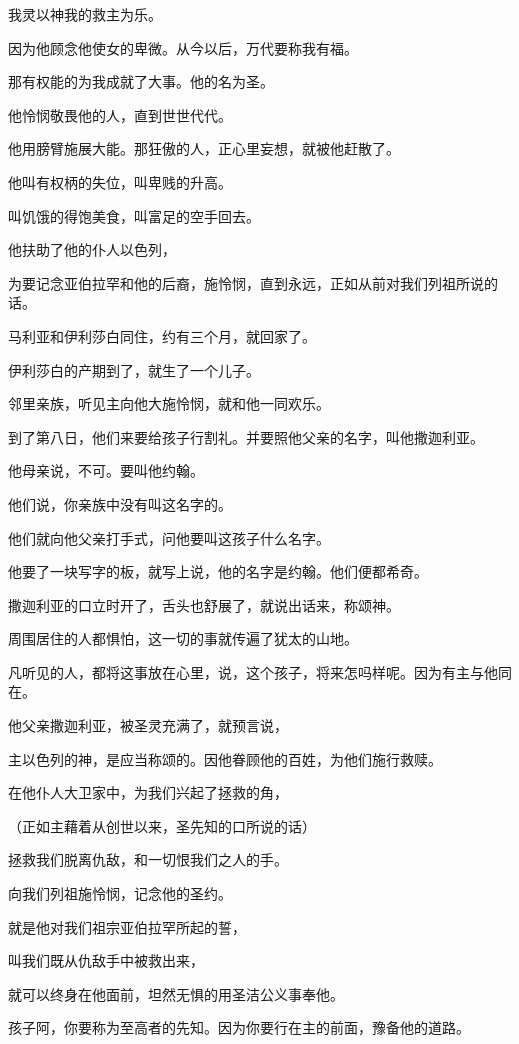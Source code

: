 \documentclass[12pt,oneside]{book}
\begin{document}
我灵以神我的救主为乐。

因为他顾念他使女的卑微。从今以后，万代要称我有福。

那有权能的为我成就了大事。他的名为圣。

他怜悯敬畏他的人，直到世世代代。

他用膀臂施展大能。那狂傲的人，正心里妄想，就被他赶散了。

他叫有权柄的失位，叫卑贱的升高。

叫饥饿的得饱美食，叫富足的空手回去。

他扶助了他的仆人以色列，

为要记念亚伯拉罕和他的后裔，施怜悯，直到永远，正如从前对我们列祖所说的话。

马利亚和伊利莎白同住，约有三个月，就回家了。

伊利莎白的产期到了，就生了一个儿子。

邻里亲族，听见主向他大施怜悯，就和他一同欢乐。

到了第八日，他们来要给孩子行割礼。并要照他父亲的名字，叫他撒迦利亚。

他母亲说，不可。要叫他约翰。

他们说，你亲族中没有叫这名字的。

他们就向他父亲打手式，问他要叫这孩子什么名字。

他要了一块写字的板，就写上说，他的名字是约翰。他们便都希奇。

撒迦利亚的口立时开了，舌头也舒展了，就说出话来，称颂神。

周围居住的人都惧怕，这一切的事就传遍了犹太的山地。

凡听见的人，都将这事放在心里，说，这个孩子，将来怎吗样呢。因为有主与他同在。

他父亲撒迦利亚，被圣灵充满了，就预言说，

主以色列的神，是应当称颂的。因他眷顾他的百姓，为他们施行救赎。

在他仆人大卫家中，为我们兴起了拯救的角，

（正如主藉着从创世以来，圣先知的口所说的话）

拯救我们脱离仇敌，和一切恨我们之人的手。

向我们列祖施怜悯，记念他的圣约。

就是他对我们祖宗亚伯拉罕所起的誓，

叫我们既从仇敌手中被救出来，

就可以终身在他面前，坦然无惧的用圣洁公义事奉他。

孩子阿，你要称为至高者的先知。因为你要行在主的前面，豫备他的道路。
\end{document}
